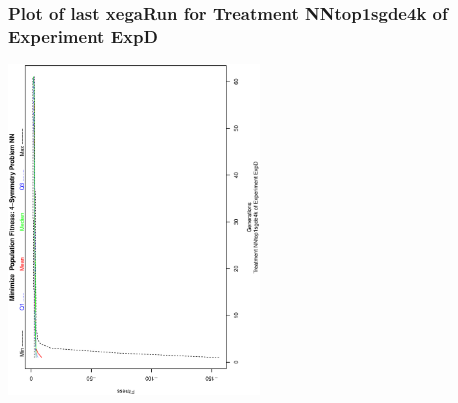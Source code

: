  \begin{frame}
 \frametitle{ Plot of last xegaRun for Treatment NNtop1sgde4k of Experiment ExpD }
 \begin{center}
\includegraphics[width=0.5\textwidth, angle=-90]
{ExpDPlotPopStatsFigure007.eps}
 \end{center}
 \label{report/ExpDPlotPopStatsFigure007.eps}  
 \end{frame}

